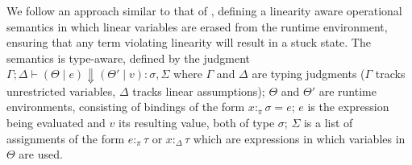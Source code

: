 \documentclass[acmsmall,review,anonymous,screen]{acmart}
\begin{document}
We follow an approach
similar to that of \cite{cite:linearhaskell}, defining a linearity
aware operational semantics in which linear variables are erased from
the runtime environment, ensuring that any term violating linearity
will result in a stuck state. The semantics is type-aware, defined by
the judgment $\Gamma ; \Delta \vdash (\Theta \mid e) \Downarrow (\Theta'
\mid v) : \sigma , \Sigma$ where $\Gamma$ and $\Delta$ are typing judgments
($\Gamma$ tracks unrestricted variables, $\Delta$ tracks linear
assumptions);
$\Theta$ and $\Theta'$ are runtime environments, consisting of bindings of the form
$x :_\pi \sigma = e$; $e$ is the expression being evaluated and $v$
its resulting value, both of type $\sigma$; $\Sigma$ is a list of assignments of the form
$e :_\pi \tau$ or $x :_\Delta \tau$ which are expressions in which variables in $\Theta$ are used.
\end{document}
